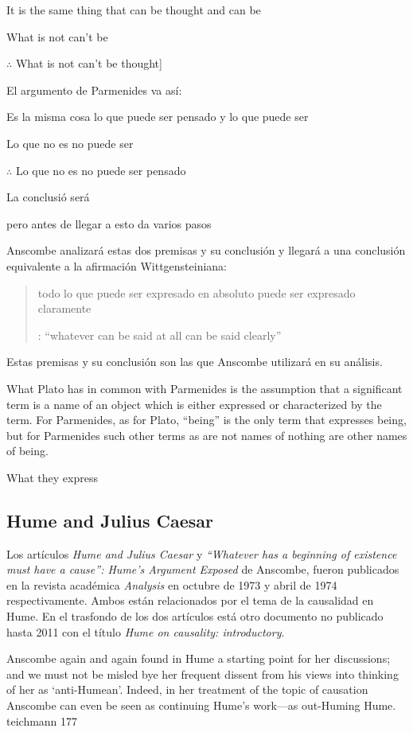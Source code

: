 It is the same thing that can be thought and can be

What is not can't be

$\therefore$ What is not can't be thought]{El argumento de Parmenides va así:

  \hspace{.459cm}Es la misma cosa lo que puede ser pensado y lo que puede ser

  \hspace{.459cm}Lo que no es no puede ser

  \hspace{.459cm}$\therefore$ Lo que no es no puede ser pensado}

La conclusió será

pero antes de llegar a esto da varios pasos

Anscombe analizará estas dos premisas y su conclusión y llegará a una conclusión
equivalente a la afirmación Wittgensteiniana:
\blockquote[{\cite[8]{anscombe1981parmenides:pmc}}: ``whatever can be said at
all can be said clearly'']{todo lo que puede ser expresado en absoluto puede ser
  expresado claramente}.

Estas premisas y su conclusión
son las que Anscombe utilizará en su análisis.

What Plato has in common with Parmenides is the assumption that a significant
term is a name of an object which is either expressed or characterized by the
term. For Parmenides, as for Plato, ``being'' is the only term that expresses
being, but for Parmenides such other terms as are not names of nothing are other
names of being.

What they express

\subsection{Hume and Julius Caesar}

Los artículos \emph{Hume and Julius Caesar} y \emph{``Whatever has a beginning
  of existence must have a cause'': Hume’s Argument Exposed} de Anscombe, fueron
publicados en la revista académica \emph{Analysis} en octubre de 1973 y abril de
1974 respectivamente. Ambos están relacionados por el tema de la causalidad en
Hume. En el trasfondo de los dos artículos está otro documento no publicado
hasta 2011 con el título \emph{Hume on causality: introductory}.

Anscombe again and again found in Hume a starting point for her discussions; and
we must not be misled bye her frequent dissent from his views into thinking of
her as `anti-Humean'. Indeed, in her treatment of the topic of causation
Anscombe can even be seen as continuing Hume's work---as out-Huming Hume.
teichmann 177

